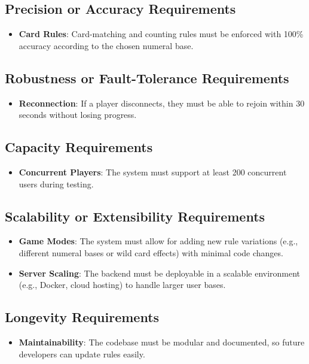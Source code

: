 \documentclass[12pt]{article}
\begin{document}
\subsection{Precision or Accuracy Requirements}
	\begin{itemize}
		\item\textbf{Card Rules}: Card-matching and counting rules must be enforced with 100\% accuracy according to the chosen numeral base.
	\end{itemize}

\subsection{Robustness or Fault-Tolerance Requirements}
	\begin{itemize}
		\item\textbf{Reconnection}: If a player disconnects, they must be able to rejoin within 30 seconds without losing progress.
	\end{itemize}

\subsection{Capacity Requirements}
	\begin{itemize}
		\item\textbf{Concurrent Players}: The system must support at least 200 concurrent users during testing.
	\end{itemize}

\subsection{Scalability or Extensibility Requirements}
	\begin{itemize}
		\item\textbf{Game Modes}: The system must allow for adding new rule variations (e.g., different numeral bases or wild card effects) with minimal code changes.
		\item \textbf{Server Scaling}: The backend must be deployable in a scalable environment (e.g., Docker, cloud hosting) to handle larger user bases.
	\end{itemize}

\subsection{Longevity Requirements}
	\begin{itemize}
		\item\textbf{Maintainability}: The codebase must be modular and documented, so future developers can update rules easily.
	\end{itemize}
\end{document}
